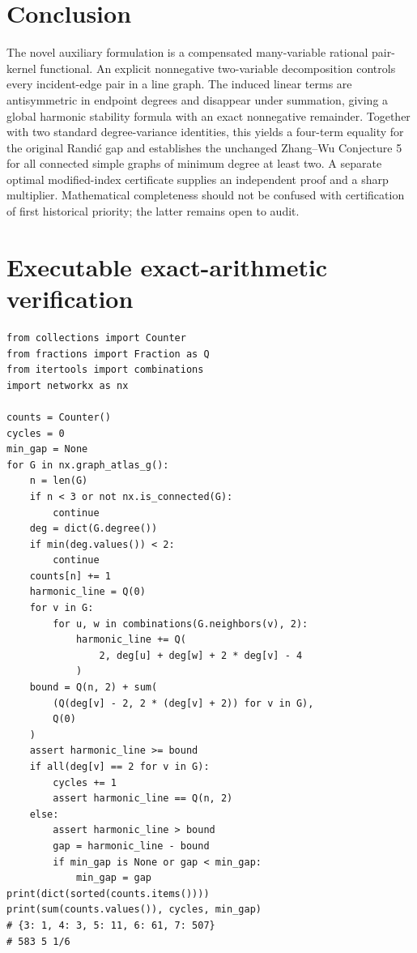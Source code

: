 \documentclass[11pt,a4paper]{article}
\theoremstyle{remark}
\begin{document}
\section{Conclusion}
The novel auxiliary formulation is a compensated many-variable rational pair-kernel functional. An explicit nonnegative two-variable decomposition controls every incident-edge pair in a line graph. The induced linear terms are antisymmetric in endpoint degrees and disappear under summation, giving a global harmonic stability formula with an exact nonnegative remainder. Together with two standard degree-variance identities, this yields a four-term equality for the original Randi\'c gap and establishes the unchanged Zhang--Wu Conjecture 5 for all connected simple graphs of minimum degree at least two. A separate optimal modified-index certificate supplies an independent proof and a sharp multiplier. Mathematical completeness should not be confused with certification of first historical priority; the latter remains open to audit.

\appendix
\section{Executable exact-arithmetic verification}\label{app:code}
\begin{verbatim}
from collections import Counter
from fractions import Fraction as Q
from itertools import combinations
import networkx as nx

counts = Counter()
cycles = 0
min_gap = None
for G in nx.graph_atlas_g():
    n = len(G)
    if n < 3 or not nx.is_connected(G):
        continue
    deg = dict(G.degree())
    if min(deg.values()) < 2:
        continue
    counts[n] += 1
    harmonic_line = Q(0)
    for v in G:
        for u, w in combinations(G.neighbors(v), 2):
            harmonic_line += Q(
                2, deg[u] + deg[w] + 2 * deg[v] - 4
            )
    bound = Q(n, 2) + sum(
        (Q(deg[v] - 2, 2 * (deg[v] + 2)) for v in G),
        Q(0)
    )
    assert harmonic_line >= bound
    if all(deg[v] == 2 for v in G):
        cycles += 1
        assert harmonic_line == Q(n, 2)
    else:
        assert harmonic_line > bound
        gap = harmonic_line - bound
        if min_gap is None or gap < min_gap:
            min_gap = gap
print(dict(sorted(counts.items())))
print(sum(counts.values()), cycles, min_gap)
# {3: 1, 4: 3, 5: 11, 6: 61, 7: 507}
# 583 5 1/6
\end{verbatim}
\end{document}
